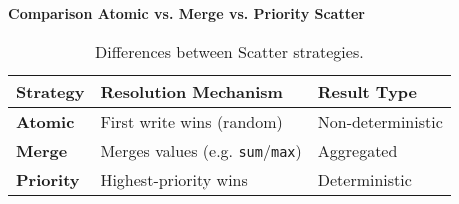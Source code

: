 \highspace
\begin{flushleft}
    \textcolor{Green3}{ \textbf{Comparison Atomic vs. Merge vs. Priority Scatter}}
\end{flushleft}
\begin{table}[!htp]
    \centering
    \begin{tabular}{@{} l l l @{}}
        \toprule
        Strategy & \textbf{Resolution Mechanism} & \textbf{Result Type} \\
        \midrule
        \textbf{Atomic}     & First write wins (random)     & Non-deterministic \\
        \textbf{Merge}      & Merges values (e.g. \texttt{sum}/\texttt{max})  & Aggregated \\
        \textbf{Priority}   & Highest-priority wins         & Deterministic \\
        \bottomrule
    \end{tabular}
    \caption{Differences between Scatter strategies.}
\end{table}
